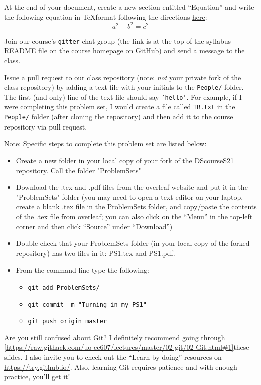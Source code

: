 \documentclass[12pt,english]{exam}
\begin{document}
\begin{questions}
\question At the end of your document, create a new section entitled ``Equation'' and write the following equation in \TeX format following the directions \href{https://www.overleaf.com/learn/latex/mathematical_expressions}{here}:
\begin{equation}
	a^{2} + b^{2} = c^{2}
\end{equation}

\question Join our course's \texttt{gitter} chat group (the link is at the top of the syllabus README file on the course homepage on GitHub) and send a message to the class.

\question Issue a pull request to our class repository (note: \emph{not} your private fork of the class repository) by adding a text file with your initials to the \texttt{People/} folder. The first (and only) line of the text file should say \texttt{'hello'}. For example, if I were completing this problem set, I would create a file called \texttt{TR.txt} in the \texttt{People/} folder (after cloning the repository) and then add it to the course repository via pull request.

\end{questions}

Note: Specific steps to complete this problem set are listed below:
\begin{itemize}
\item Create a new folder in your local copy of your fork of the DScourseS21 repository. Call the folder "ProblemSets"
\item Download the .tex and .pdf files from the overleaf website and put it in the "ProblemSets" folder (you may need to open a text editor on your laptop, create a blank .tex file in the ProblemSets folder, and copy/paste the contents of the .tex file from overleaf; you can also click on the ``Menu'' in the top-left corner and then click ``Source'' under ``Download'')
\item Double check that your ProblemSets folder (in your local copy of the forked repository) has two files in it: PS1.tex and PS1.pdf.
\item From the command line type the following:
    \begin{itemize}
    \item \texttt{git add ProblemSets/}
    \item \texttt{git commit -m "Turning in my PS1"}
    \item \texttt{git push origin master}
    \end{itemize}
\end{itemize}

Are you still confused about Git? I definitely recommend going through \ref{https://raw.githack.com/uo-ec607/lectures/master/02-git/02-Git.html#1}{these slides}. I also invite you to check out the ``Learn by doing'' resources on \url{https://try.github.io/}. Also, learning Git requires patience and with enough practice, you'll get it!
\end{document}
